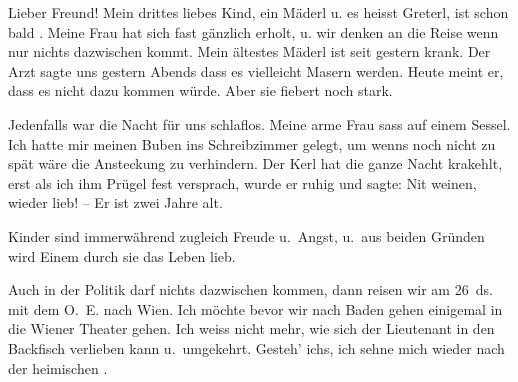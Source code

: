 \pstart{}Lieber Freund!\pend\vspace{0.5em}
\pstart
           Mein drittes liebes Kind,
               ein Mäderl u. es heisst Greterl, ist schon
               bald \label{K_L03830-1v}\label{K_L03830-1}. Meine Frau hat sich fast gänzlich erholt, u. wir denken an die
               Reise wenn nur nichts dazwischen kommt. Mein ältestes Mäderl ist seit gestern
               krank. Der Arzt sagte uns
                  gestern Abends dass es vielleicht Masern werden. Heute
               meint er, dass es nicht dazu kommen würde. Aber sie fiebert noch stark.\pend
           
\pstart
           Jedenfalls war die Nacht für uns schlaflos. Meine arme Frau sass auf einem Sessel. Ich hatte mir
               meinen Buben ins
               Schreibzimmer gelegt, um wenns noch nicht zu {\pb}spät wäre die Ansteckung zu verhindern.
               Der Kerl hat die ganze Nacht
               krakehlt, erst als ich ihm Prügel fest versprach, wurde er ruhig und sagte: Nit
               weinen, wieder lieb! – Er ist zwei Jahre alt.\pend
           
\pstart
           Kinder sind immerwährend zugleich Freude u. Angst, u. aus beiden Gründen wird Einem
               durch sie das Leben lieb.\pend
           
\pstart
           Auch in der Politik darf nichts dazwischen kommen, dann reisen wir am
                  26 ds. mit dem O. E. nach Wien. Ich möchte bevor wir nach Baden gehen einigemal in die Wiener Theater gehen. Ich weiss nicht mehr, wie sich der Lieutenant in den
               Backfisch verlieben kann u. umgekehrt. Gesteh’ ichs, ich sehne mich wieder nach der
               heimischen \label{K_L03830-2v}\label{K_L03830-2}.\pend
           
